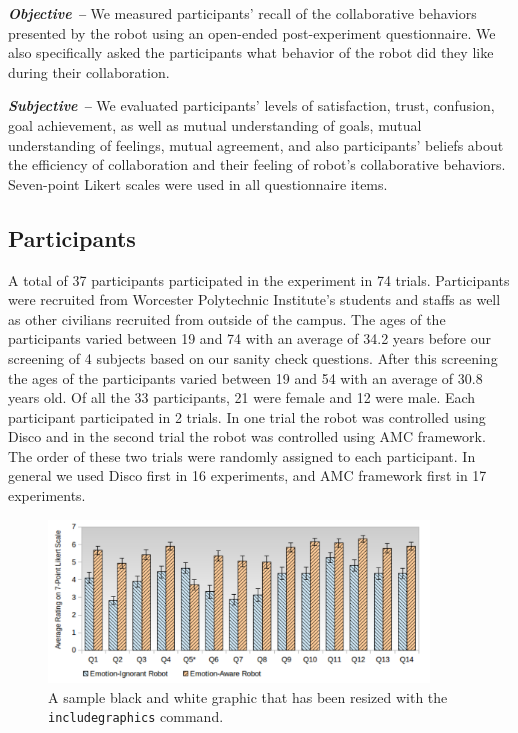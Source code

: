 \documentclass{sig-alternate-05-2015}
\begin{document}
\textit{\textbf{Objective -- }} We measured participants' recall of the
collaborative behaviors presented by the robot using an open-ended
post-experiment questionnaire. We also specifically asked the participants what
behavior of the robot did they like during their collaboration.

\textit{\textbf{Subjective -- }} We evaluated participants' levels of
satisfaction, trust, confusion, goal achievement, as well as mutual
understanding of goals, mutual understanding of feelings, mutual agreement, and
also participants' beliefs about the efficiency of collaboration and their
feeling of robot's collaborative behaviors. Seven-point Likert scales were used
in all questionnaire items.

\subsection{Participants}
\label{sec:Participants}
A total of 37 participants participated in the experiment in 74 trials.
Participants were recruited from Worcester Polytechnic Institute's students and
staffs as well as other civilians recruited from outside of the campus. The ages
of the participants varied between 19 and 74 with an average of 34.2 years
before our screening of 4 subjects based on our sanity check questions. After
this screening the ages of the participants varied between 19 and 54 with an
average of 30.8 years old. Of all the 33 participants, 21 were female and 12
were male. Each participant participated in 2 trials. In one trial the robot was
controlled using Disco and in the second trial the robot was controlled using
AMC framework. The order of these two trials were randomly assigned to each
participant. In general we used Disco first in 16 experiments, and AMC framework
first in 17 experiments.

\begin{figure}[tbh]
\centering
\includegraphics[width=0.9\textwidth]{figure/14Questions.pdf}
\caption{A sample black and white graphic
that has been resized with the \texttt{includegraphics} command.}
\label{fig:14Questions}
\end{figure}
\end{document}
